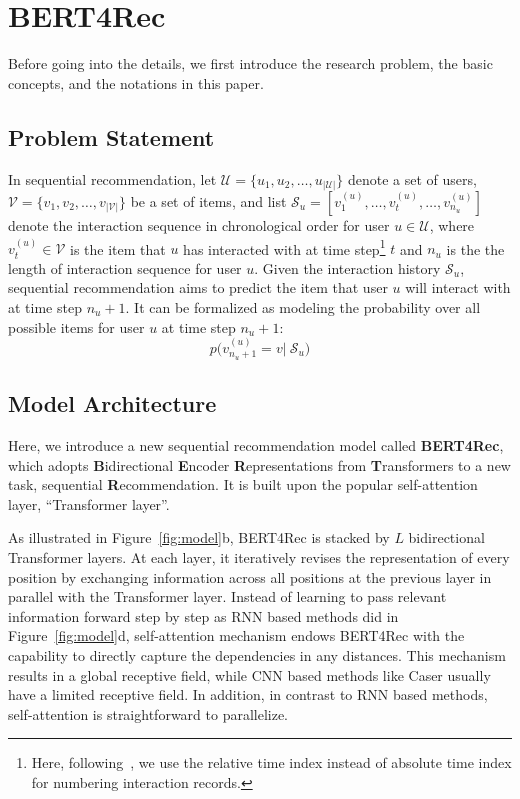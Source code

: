 



\section{BERT4Rec}
Before going into the details, we first introduce the research problem, the basic concepts, and the notations in this paper.

\subsection{Problem Statement}
In sequential recommendation, let $\mathcal{U}{=}\{u_1,u_2,\dots,u_{\vert\mathcal{U}\vert}\}$ denote a set of users, $\mathcal{V}{=}\{v_1,v_2,\dots,v_{|\mathcal{V}|}\}$ be a set of items, and list $\mathcal{S}_u{=}[v_1^{(u)},\dots,v_t^{(u)},\dots,v_{n_u}^{(u)}]$ denote the interaction sequence in chronological order for user $u \in \mathcal{U}$, where $v_t^{(u)} \in \mathcal{V}$ is the item that $u$ has interacted with at time step\footnote{Here, following~\cite{Rendle:WWW2010:FPM,Kang:ICDM2018:SAS}, we use the relative time index instead of absolute time index for numbering interaction records.} $t$ and $n_u$ is the the length of interaction sequence for user $u$.
Given the interaction history $\mathcal{S}_u$, sequential recommendation aims to predict the item that user $u$ will interact with at time step $n_{u} + 1$.
It can be formalized as modeling the probability over all possible items for user $u$ at time step $n_{u} {+} 1$:
\begin{equation*}
    p\bigl(v_{n_u+1}^{(u)}=v|\ \mathcal{S}_u\bigr)
\end{equation*}


\subsection{Model Architecture}

Here, we introduce a new sequential recommendation model called \textbf{BERT4Rec}, which adopts \textbf{B}idirectional \textbf{E}ncoder \textbf{R}epresentations from \textbf{T}ransformers to a new task, sequential \textbf{R}ecommendation.
It is built upon the popular self-attention layer, ``Transformer layer''. %

As illustrated in Figure~\ref{fig:model}b, BERT4Rec is stacked by $L$ bidirectional Transformer layers.
At each layer, it iteratively revises the representation of every position by exchanging information across all positions at the previous layer in parallel with the Transformer layer.
Instead of learning to pass relevant information forward step by step as RNN based methods did in Figure~\ref{fig:model}d, self-attention mechanism endows BERT4Rec with the capability to directly capture the dependencies in any distances.
This mechanism results in a global receptive field, while CNN based methods like Caser usually have a limited receptive field.
In addition, in contrast to RNN based methods, self-attention is straightforward to parallelize.




